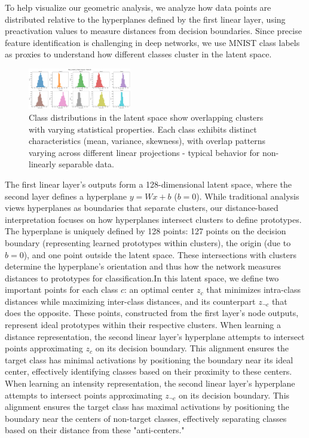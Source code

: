 To help visualize our geometric analysis, we analyze how data points are distributed relative to the hyperplanes defined by the first linear layer, using preactivation values to measure distances from decision boundaries. Since precise feature identification is challenging in deep networks, we use MNIST class labels as proxies to understand how different classes cluster in the latent space.
\begin{figure}[H]
    \centering
    \includegraphics[width=0.4\textwidth]{images/distance_distribution}
    \caption{Class distributions in the latent space show overlapping clusters with varying statistical properties. Each class exhibits distinct characteristics (mean, variance, skewness), with overlap patterns varying across different linear projections - typical behavior for non-linearly separable data.}
    \label{fig:distance_distribution}
\end{figure}
The first linear layer's outputs form a 128-dimensional latent space, where the second layer defines a hyperplane $y=Wx+b$ ($b=0$). While traditional analysis views hyperplanes as boundaries that separate clusters, our distance-based interpretation focuses on how hyperplanes intersect clusters to define prototypes. The hyperplane is uniquely defined by 128 points: 127 points on the decision boundary (representing learned prototypes within clusters), the origin (due to $b=0$), and one point outside the latent space. These intersections with clusters determine the hyperplane's orientation and thus how the network measures distances to prototypes for classification.In this latent space, we define two important points for each class $c$: an optimal center $z_c$ that minimizes intra-class distances while maximizing inter-class distances, and its counterpart $z_{\neg c}$ that does the opposite. These points, constructed from the first layer's node outputs, represent ideal prototypes within their respective clusters.
When learning a distance representation, the second linear layer's hyperplane attempts to intersect points approximating $z_c$ on its decision boundary. This alignment ensures the target class has minimal activations by positioning the boundary near its ideal center, effectively identifying classes based on their proximity to these centers.
When learning an intensity representation, the second linear layer's hyperplane attempts to intersect points approximating $z_{\neg c}$ on its decision boundary. This alignment ensures the target class has maximal activations by positioning the boundary near the centers of non-target classes, effectively separating classes based on their distance from these "anti-centers."
